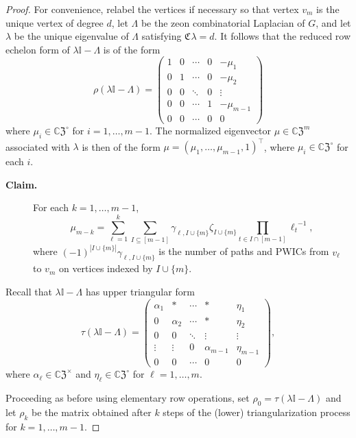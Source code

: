 \documentclass{article}
\theoremstyle{definition}
\newcommand{\zco}{\mathfrak{C}\mspace{1mu}}
\newcommand{\CZ}{\mathbb{C}\mathfrak{Z}}
\newcommand{\mI}{\mathbb{I}}
\numberwithin{equation}{section}
\begin{document}
\begin{proof}
For convenience, relabel the vertices if necessary so that vertex $v_m$ is the unique vertex of degree $d$, let $\Lambda$ be the zeon combinatorial Laplacian of $G$, and let $\lambda$ be the unique eigenvalue of $\Lambda$ satisfying $\zco \lambda=d$.
It follows that the reduced row echelon form of $\lambda\mI-\Lambda$ is of the form \begin{equation}\label{RRF}
\rho(\lambda\mI-\Lambda)=\begin{pmatrix}
1&0&\cdots&0&-\mu_1\\
0&1&\cdots&0&-\mu_2\\
0&0&\ddots&0&\vdots\\
0&0&\cdots&1&-\mu_{m-1}\\
0&0&\cdots&0&0
\end{pmatrix}
\end{equation}
where $\mu_i\in\CZ^\circ$ for $i=1, \ldots, m-1$.  The normalized eigenvector $\mu\in\CZ^m$ associated with $\lambda$ is then of the form  $\mu=(\mu_1, \ldots, \mu_{m-1}, 1)^\intercal$, where $\mu_i\in\CZ^\circ$ for each $i$.  

\begin{description}
\item [{\bf Claim.}]
For each $k=1, \ldots, m-1$, 
\begin{equation}\label{mu form}
\mu_{m-k}=\sum_{\ell=1}^{k}\sum_{I\subseteq[m-1]}\gamma_{\ell,I\cup\{m\}}\zeta_{I\cup\{m\}}\prod_{t\in I\cap[m-1]}{\ell_t}^{-1},
\end{equation}
where $(-1)^{|I\cup\{m\}|}\gamma_{\ell, I\cup\{m\}}$ is the number of paths and PWICs from $v_{\ell}$ to $v_m$ on vertices indexed by $I\cup\{m\}$.  
\end{description}

Recall that $\lambda\mI-\Lambda$ has upper triangular form \begin{equation}
\tau(\lambda\mI-\Lambda)=\left(\begin{matrix}
\alpha_1&*&\cdots&*&\eta_1\\
0&\alpha_2&\cdots&*&\eta_2\\
0&0&\ddots&\vdots&\vdots\\
\vdots&\vdots&0&\alpha_{m-1}&\eta_{m-1}\\
0&0&\cdots&0&0
\end{matrix}\right),  
 \end{equation}
where $\alpha_\ell\in\CZ^\times$ and $\eta_\ell\in\CZ^\circ$ for $\ell=1, \ldots, m$. 

Proceeding as before using elementary row operations, set $\rho_0=\tau(\lambda\mI-\Lambda)$ and let $\rho_k$ be the matrix obtained after $k$ steps of the (lower) triangularization process for $k=1, \ldots, m-1$.  


\end{proof}
\end{document}
